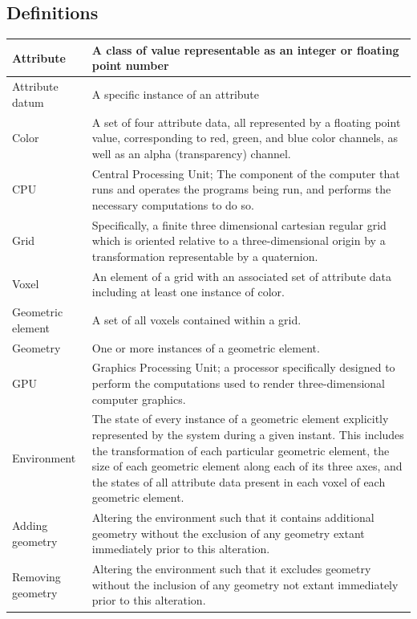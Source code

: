 \documentclass[onecolumn, draftclsnofoot,10pt, compsoc]{IEEEtran}
\begin{document}
\subsection{Definitions}
\begin{longtable}{ | l | p{12cm} | }
 \hline			
 Attribute & A class of value representable as an integer or floating point number  \\ \hline
 Attribute datum & A specific instance of an attribute  \\ \hline
 Color & A set of four attribute data, all represented by a floating point value, corresponding to red, green, and blue color channels, as well as an alpha (transparency) channel.  \\ \hline
 CPU & Central Processing Unit; The component of the computer that runs and operates the programs being run, and performs the necessary computations to do so.  \\ \hline
 Grid &  Specifically, a finite three dimensional cartesian regular grid which is oriented relative to a three-dimensional origin by a transformation representable by a quaternion. \\ \hline
 Voxel & An element of a grid with an associated set of attribute data including at least one instance of color.  \\ \hline
 Geometric element & A set of all voxels contained within a grid.  \\ \hline
 Geometry & One or more instances of a geometric element.  \\ \hline
 GPU & Graphics Processing Unit; a processor specifically designed to perform the computations used to render three-dimensional computer graphics.  \\ \hline
 Environment & The state of every instance of a geometric element explicitly represented by the system during a given instant. This includes the transformation of each particular geometric element, the size of each geometric element along each of its three axes, and the states of all attribute data present in each voxel of each geometric element. \\ \hline
Adding geometry & Altering the environment such that it contains additional geometry without the exclusion of any geometry extant immediately prior to this alteration.  \\ \hline
 Removing geometry & Altering the environment such that it excludes geometry without the inclusion of any geometry not extant immediately prior to this alteration.  \\ \hline

\end{longtable}
\end{document}
